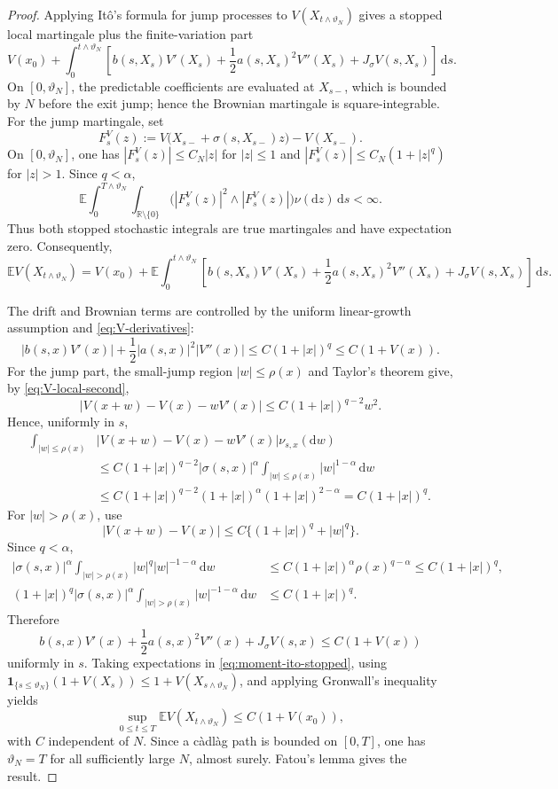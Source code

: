 \documentclass[10pt,a4paper]{amsart}
\newcommand{\R}{\mathbb{R}}
\newcommand{\E}{\mathbb{E}}
\newcommand{\1}{\mathbf{1}}
\newcommand{\dd}{\,\mathrm{d}}
\newcommand{\md}{\mathrm{d}}
\begin{document}
\begin{proof}
Applying It\^o's formula for jump processes to $V(X_{t\wedge\vartheta_N})$ gives a stopped local martingale plus the finite-variation part
\[
V(x_0)+\int_0^{t\wedge\vartheta_N}
\left[b(s,X_s)V'(X_s)+\frac12a(s,X_s)^2V''(X_s)+J_\sigma V(s,X_s)\right]\dd s.
\]
On $[0,\vartheta_N]$, the predictable coefficients are evaluated at $X_{s-}$, which is bounded by $N$ before the exit jump; hence the Brownian martingale is square-integrable. For the jump martingale, set
\begin{equation}\label{eq:FV-definition}
F_s^V(z):=V\bigl(X_{s-}+\sigma(s,X_{s-})z\bigr)-V(X_{s-}).
\end{equation}
On $[0,\vartheta_N]$, one has $|F_s^V(z)|\le C_N|z|$ for $|z|\le1$ and $|F_s^V(z)|\le C_N(1+|z|^q)$ for $|z|>1$. Since $q<\alpha$,
\[
\E\int_0^{T\wedge\vartheta_N}\int_{\R\setminus\{0\}}
\bigl(|F_s^V(z)|^2\wedge |F_s^V(z)|\bigr)\nu(\md z)\dd s<\infty.
\]
Thus both stopped stochastic integrals are true martingales and have expectation zero. Consequently,
\begin{equation}\label{eq:moment-ito-stopped}
\E V(X_{t\wedge\vartheta_N})
=V(x_0)+\E\int_0^{t\wedge\vartheta_N}
\left[b(s,X_s)V'(X_s)+\frac12a(s,X_s)^2V''(X_s)+J_\sigma V(s,X_s)\right]\dd s.
\end{equation}

The drift and Brownian terms are controlled by the uniform linear-growth assumption and \eqref{eq:V-derivatives}:
\[
|b(s,x)V'(x)|+\frac12|a(s,x)|^2|V''(x)|
\le C(1+|x|)^q\le C(1+V(x)).
\]
For the jump part, the small-jump region $|w|\le\rho(x)$ and Taylor's theorem give, by \eqref{eq:V-local-second},
\[
  |V(x+w)-V(x)-wV'(x)|
  \le C(1+|x|)^{q-2}w^2.
\]
Hence, uniformly in $s$,
\begin{align*}
\int_{|w|\le\rho(x)}&|V(x+w)-V(x)-wV'(x)|\nu_{s,x}(\md w)\\
&\le C(1+|x|)^{q-2}|\sigma(s,x)|^\alpha
    \int_{|w|\le\rho(x)}|w|^{1-\alpha}\dd w\\
&\le C(1+|x|)^{q-2}(1+|x|)^\alpha(1+|x|)^{2-\alpha}
 =C(1+|x|)^q.
\end{align*}
For $|w|>\rho(x)$, use
\[
  |V(x+w)-V(x)|\le C\{(1+|x|)^q+|w|^q\}.
\]
Since $q<\alpha$,
\begin{align*}
|\sigma(s,x)|^\alpha\int_{|w|>\rho(x)}|w|^q|w|^{-1-\alpha}\dd w
&\le C(1+|x|)^\alpha\rho(x)^{q-\alpha}
 \le C(1+|x|)^q,\\
(1+|x|)^q|\sigma(s,x)|^\alpha\int_{|w|>\rho(x)}|w|^{-1-\alpha}\dd w
&\le C(1+|x|)^q.
\end{align*}
Therefore
\[
 b(s,x)V'(x)+\frac12a(s,x)^2V''(x)+J_\sigma V(s,x)
 \le C(1+V(x))
\]
uniformly in $s$. Taking expectations in \eqref{eq:moment-ito-stopped}, using
$\1_{\{s\le\vartheta_N\}}(1+V(X_s))\le1+V(X_{s\wedge\vartheta_N})$, and applying Gronwall's inequality yields
\[
  \sup_{0\le t\le T}\E V(X_{t\wedge\vartheta_N})\le C(1+V(x_0)),
\]
with $C$ independent of $N$. Since a c\`adl\`ag path is bounded on $[0,T]$, one has $\vartheta_N=T$ for all sufficiently large $N$, almost surely. Fatou's lemma gives the result.
\end{proof}
\end{document}
